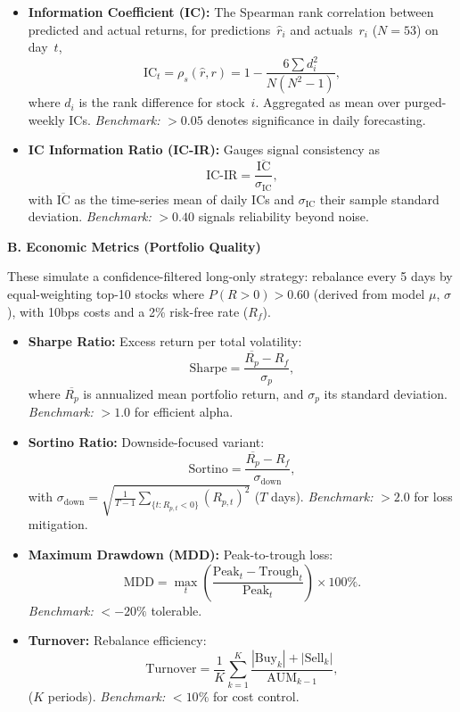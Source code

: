 \documentclass[twoside,final]{hcmut-report}
\begin{document}
\begin{itemize}
  \item \textbf{Information Coefficient (IC):} The Spearman rank correlation between predicted and actual returns, for predictions~$\hat{r}_i$ and actuals~$r_i$ ($N=53$) on day~$t$,
        $$
          \text{IC}_t = \rho_s(\hat{r}, r) = 1 - \frac{6 \sum d_i^2}{N(N^2 - 1)},
        $$
        where $d_i$ is the rank difference for stock~$i$. Aggregated as mean over purged-weekly ICs. \emph{Benchmark:} $>0.05$ denotes significance in daily forecasting.
  \item \textbf{IC Information Ratio (IC-IR):} Gauges signal consistency as
        $$
          \text{IC-IR} = \frac{\overline{\text{IC}}}{\sigma_{\text{IC}}},
        $$
        with $\overline{\text{IC}}$ as the time-series mean of daily ICs and $\sigma_{\text{IC}}$ their sample standard deviation. \emph{Benchmark:} $>0.40$ signals reliability beyond noise.
\end{itemize}

\textbf{B. Economic Metrics (Portfolio Quality)}

These simulate a confidence-filtered long-only strategy: rebalance every 5 days by equal-weighting top-10 stocks where $P(R > 0) > 0.60$ (derived from model $\mu$, $\sigma$), with 10bps costs and a 2\% risk-free rate ($R_f$).

\begin{itemize}
  \item \textbf{Sharpe Ratio:} Excess return per total volatility:
        $$
          \text{Sharpe} = \frac{\overline{R_p} - R_f}{\sigma_p},
        $$
        where $\overline{R_p}$ is annualized mean portfolio return, and $\sigma_p$ its standard deviation. \emph{Benchmark:} $>1.0$ for efficient alpha.
  \item \textbf{Sortino Ratio:} Downside-focused variant:
        $$
          \text{Sortino} = \frac{\overline{R_p} - R_f}{\sigma_{\text{down}}},
        $$
        with $\sigma_{\text{down}} = \sqrt{\frac{1}{T-1} \sum_{\{t: R_{p,t} < 0\}} (R_{p,t})^2}$ ($T$ days). \emph{Benchmark:} $>2.0$ for loss mitigation.
  \item \textbf{Maximum Drawdown (MDD):} Peak-to-trough loss:
        $$
          \text{MDD} = \max_t \left( \frac{\text{Peak}_t - \text{Trough}_t}{\text{Peak}_t} \right) \times 100\%.
        $$
        \emph{Benchmark:} $<-20\%$ tolerable.
  \item \textbf{Turnover:} Rebalance efficiency:
        $$
          \text{Turnover} = \frac{1}{K} \sum_{k=1}^K \frac{|\text{Buy}_k| + |\text{Sell}_k|}{\text{AUM}_{k-1}},
        $$
        ($K$ periods). \emph{Benchmark:} $<10\%$ for cost control.
\end{itemize}
\end{document}
